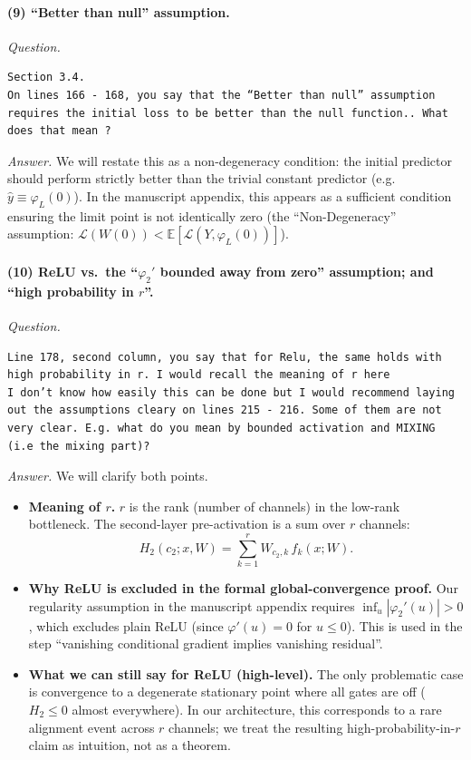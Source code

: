 \documentclass[11pt,a4paper]{article}
\begin{document}
\paragraph{(9) ``Better than null'' assumption.}
\textit{Question.}\par
\begin{verbatim}
Section 3.4.
On lines 166 - 168, you say that the “Better than null” assumption requires the initial loss to be better than the null function.. What does that mean ?
\end{verbatim}
\textit{Answer.} We will restate this as a non-degeneracy condition: the initial predictor should perform strictly better than the trivial constant predictor (e.g.\ $\hat y\equiv \varphi_L(0)$). In the manuscript appendix, this appears as a sufficient condition ensuring the limit point is not identically zero (the ``Non-Degeneracy'' assumption: $\mathscr{L}(W(0))<\mathbb{E}[\mathcal{L}(Y,\varphi_L(0))]$).

\paragraph{(10) ReLU vs.\ the ``$\varphi_2'$ bounded away from zero'' assumption; and ``high probability in $r$''.}
\textit{Question.}\par
\begin{verbatim}
Line 178, second column, you say that for Relu, the same holds with high probability in r. I would recall the meaning of r here
I don’t know how easily this can be done but I would recommend laying out the assumptions cleary on lines 215 - 216. Some of them are not very clear. E.g. what do you mean by bounded activation and MIXING (i.e the mixing part)?
\end{verbatim}
\textit{Answer.} We will clarify both points.
\begin{itemize}
  \item \textbf{Meaning of $r$.} $r$ is the rank (number of channels) in the low-rank bottleneck. The second-layer pre-activation is a sum over $r$ channels:
  \[
  H_2(c_2;x,W)=\sum_{k=1}^r W_{c_2,k}\,f_k(x;W).
  \]
  \item \textbf{Why ReLU is excluded in the formal global-convergence proof.} Our regularity assumption in the manuscript appendix requires $\inf_u|\varphi_2'(u)|>0$, which excludes plain ReLU (since $\varphi'(u)=0$ for $u\le 0$). This is used in the step ``vanishing conditional gradient implies vanishing residual''.
  \item \textbf{What we can still say for ReLU (high-level).} The only problematic case is convergence to a degenerate stationary point where all gates are off ($H_2\le 0$ almost everywhere). In our architecture, this corresponds to a rare alignment event across $r$ channels; we treat the resulting high-probability-in-$r$ claim as intuition, not as a theorem.
\end{itemize}
\end{document}
